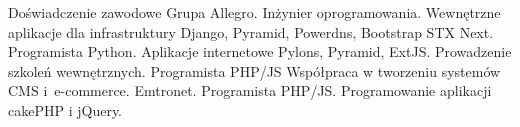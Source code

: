 \begin{rubric}{Doświadczenie zawodowe}
\entry*[X 2013 -- obecnie]Grupa Allegro. Inżynier oprogramowania.\newline
Wewnętrzne aplikacje dla infrastruktury
Django, Pyramid, Powerdns, Bootstrap
\entry*[V 2011 -- IX 2013]STX Next. Programista Python.\newline
Aplikacje internetowe \newline
Pylons, Pyramid, ExtJS.\newline
Prowadzenie szkoleń wewnętrznych.
Programista PHP/JS\newline
Współpraca w tworzeniu systemów CMS i~\hbox{e-commerce}.
\entry*[VI 2009 -- XII 2009]Emtronet. Programista PHP/JS.\newline
Programowanie aplikacji\newline
cakePHP i jQuery.
\end{rubric}
